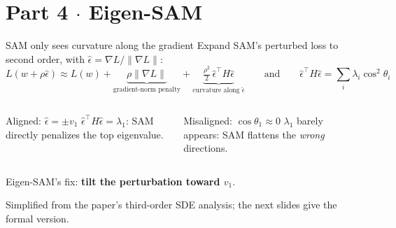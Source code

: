 \documentclass[aspectratio=169,10pt]{beamer}
\newcommand{\sectioninfo}{}
\newcommand{\sectionidea}{}
\newcommand{\partsection}[3]{%
  \renewcommand{\sectioninfo}{#2}%
  \renewcommand{\sectionidea}{#3}%
  \section{#1}}
\newcommand{\norm}[1]{\lVert #1\rVert}
\newcommand{\mt}[1]{\textcolor{muted}{#1}}
\newcommand{\source}[1]{\par\vfill{\scriptsize\mt{#1}}}
\begin{document}
\partsection{Part 4 $\cdot$ Eigen-SAM}{Luo, Truong, Pham, Harandi, Phung, Le $\cdot$ Monash \& VinAI $\cdot$ NeurIPS 2024}{Perturb where the sharpness actually is.}

\begin{frame}{SAM only sees curvature along the gradient}
Expand SAM's perturbed loss to second order, with $\hat\epsilon=\nabla L/\norm{\nabla L}$:
\[ L(w+\rho\hat\epsilon) \approx L(w) + \underbrace{\rho\norm{\nabla L}}_{\text{gradient-norm penalty}} + \underbrace{\tfrac{\rho^2}{2}\,\hat\epsilon^\top H\hat\epsilon}_{\text{curvature along }\hat\epsilon}
\qquad\text{and}\qquad
\hat\epsilon^\top H\hat\epsilon = \sum_i \lambda_i\cos^2\theta_i \]
\begin{columns}[T]
\begin{column}{0.48\textwidth}
\begin{exampleblock}{Aligned: $\hat\epsilon=\pm v_1$}
$\hat\epsilon^\top H\hat\epsilon=\lambda_1$: SAM directly penalizes the top eigenvalue.
\end{exampleblock}
\end{column}
\begin{column}{0.48\textwidth}
\begin{alertblock}{Misaligned: $\cos\theta_1\approx0$}
$\lambda_1$ barely appears: SAM flattens the \emph{wrong} directions.
\end{alertblock}
\end{column}
\end{columns}
\vspace{0.8em}
\centering
{\large Eigen-SAM's fix: \textbf{tilt the perturbation toward $v_1$}.}
\source{Simplified from the paper's third-order SDE analysis; the next slides give the formal version.}
\end{frame}
\end{document}
